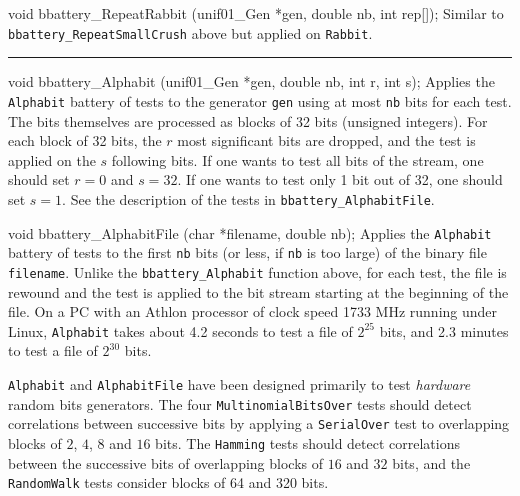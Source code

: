 void bbattery_RepeatRabbit (unif01_Gen *gen, double nb, int rep[]);
\endcode
  \tab Similar to {\tt bbattery\_RepeatSmallCrush} above but applied on
 {\tt Rabbit}.
  \endtab

\bigskip
\hrule
\code


void bbattery_Alphabit (unif01_Gen *gen, double nb, int r, int s);
\endcode
  \tab Applies the {\tt Alphabit} battery of tests to the generator {\tt gen}
   using at most {\tt nb} bits for each test. The bits themselves are
  processed as blocks of 32 bits (unsigned integers). For each block of
  32 bits, the $r$ most significant bits are dropped, and the test is
  applied on the $s$ following bits. If one wants to test all bits of
  the stream, one should set $r=0$ and $s=32$. If one wants to test only 
  1 bit out of 32, one should set $s=1$.
   See the description of the tests in {\tt bbattery\_AlphabitFile}. 
  \endtab
\code


void bbattery_AlphabitFile (char *filename, double nb);
\endcode
  \tab Applies the {\tt Alphabit} battery of tests to the first {\tt nb} 
   bits (or less, if {\tt nb} is too large) of the binary file 
   {\tt filename}. Unlike the {\tt bbattery\_Alphabit} function above,
  for each test, the file is rewound and the test is applied to the bit 
  stream starting at the beginning of the file.
  On a PC with an Athlon processor of clock speed 1733 MHz running under
  Linux,  {\tt Alphabit} takes about 4.2 seconds to test a file of
  $2^{25}$ bits, and 2.3 minutes to test a file of $2^{30}$ bits.

  {\tt Alphabit} and {\tt AlphabitFile} have been designed primarily to test
   {\it hardware} random bits generators. The four {\tt MultinomialBitsOver}
  tests should detect correlations between successive bits by
   applying a {\tt SerialOver} test to overlapping blocks of $2$, $4$,
   $8$ and $16$ bits. The {\tt Hamming} tests should detect correlations
  between the successive bits of overlapping blocks of $16$ and $32$ bits,
  and the {\tt RandomWalk} tests consider blocks of 64 and 320 bits.
  
  \endtab

